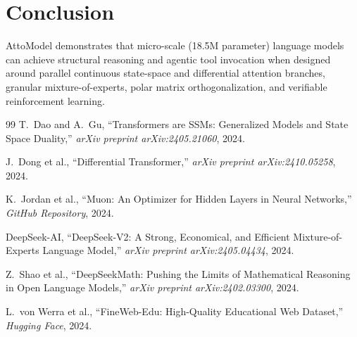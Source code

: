 \documentclass[10pt,twocolumn,letterpaper]{article}
\begin{document}
\section{Conclusion}
AttoModel demonstrates that micro-scale (18.5M parameter) language models can achieve structural reasoning and agentic tool invocation when designed around parallel continuous state-space and differential attention branches, granular mixture-of-experts, polar matrix orthogonalization, and verifiable reinforcement learning.


\begin{thebibliography}{99}
T.~Dao and A.~Gu, ``Transformers are SSMs: Generalized Models and State Space Duality,'' \emph{arXiv preprint arXiv:2405.21060}, 2024.

J.~Dong et al., ``Differential Transformer,'' \emph{arXiv preprint arXiv:2410.05258}, 2024.

K.~Jordan et al., ``Muon: An Optimizer for Hidden Layers in Neural Networks,'' \emph{GitHub Repository}, 2024.

DeepSeek-AI, ``DeepSeek-V2: A Strong, Economical, and Efficient Mixture-of-Experts Language Model,'' \emph{arXiv preprint arXiv:2405.04434}, 2024.

Z.~Shao et al., ``DeepSeekMath: Pushing the Limits of Mathematical Reasoning in Open Language Models,'' \emph{arXiv preprint arXiv:2402.03300}, 2024.

L.~von Werra et al., ``FineWeb-Edu: High-Quality Educational Web Dataset,'' \emph{Hugging Face}, 2024.
\end{thebibliography}
\end{document}

